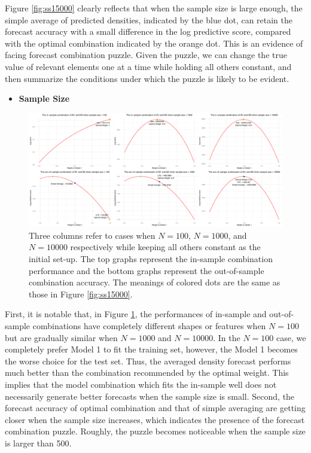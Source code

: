\documentclass{monashthesis}
\begin{document}
Figure \ref{fig:ss15000} clearly reflects that when the sample size is large enough, the simple average of predicted densities, indicated by the blue dot, can retain the forecast accuracy with a small difference in the log predictive score, compared with the optimal combination indicated by the orange dot. This is an evidence of facing forecast combination puzzle. Given the puzzle, we can change the true value of relevant elements one at a time while holding all others constant, and then summarize the conditions under which the puzzle is likely to be evident.

\begin{itemize}
\tightlist
\item
  \bf{Sample Size}
\end{itemize}

\begin{figure}[ht]
\centering
\includegraphics[scale=0.35]{figures/Sample_Size_100-10000.png}
\caption{Three columns refer to cases when $N=100$, $N=1000$, and $N=10000$ respectively while keeping all others constant as the initial set-up. The top graphs represent the in-sample combination performance and the bottom graphs represent the out-of-sample combination accuracy. The meanings of colored dots are the same as those in Figure \ref{fig:ss15000}.}
\label{fig:ss}
\end{figure}

First, it is notable that, in Figure \ref{fig:ss}, the performances of in-sample and out-of-sample combinations have completely different shapes or features when \(N=100\) but are gradually similar when \(N=1000\) and \(N=10000\). In the \(N=100\) case, we completely prefer Model 1 to fit the training set, however, the Model 1 becomes the worse choice for the test set. Thus, the averaged density forecast performs much better than the combination recommended by the optimal weight. This implies that the model combination which fits the in-sample well does not necessarily generate better forecasts when the sample size is small. Second, the forecast accuracy of optimal combination and that of simple averaging are getting closer when the sample size increases, which indicates the presence of the forecast combination puzzle. Roughly, the puzzle becomes noticeable when the sample size is larger than 500.
\end{document}
